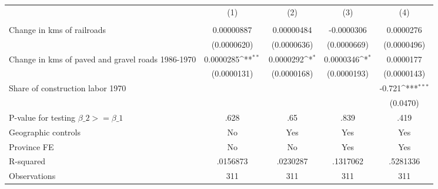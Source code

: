 {
\def\sym#1{\ifmmode^{#1}\else\(^{#1}\)\fi}
\begin{tabular}{l*{4}{c}}
\hline\hline
                &\multicolumn{1}{c}{(1)}&\multicolumn{1}{c}{(2)}&\multicolumn{1}{c}{(3)}&\multicolumn{1}{c}{(4)}\\
                &\multicolumn{1}{c}{}&\multicolumn{1}{c}{}&\multicolumn{1}{c}{}&\multicolumn{1}{c}{}\\
\hline
Change in kms of railroads&0.00000887         &0.00000484         &-0.0000306         &0.0000276         \\
                &(0.0000620)         &(0.0000636)         &(0.0000669)         &(0.0000496)         \\
[1em]
Change in kms of paved and gravel roads 1986-1970&0.0000285\sym{**} &0.0000292\sym{*}  &0.0000346\sym{*}  &0.0000177         \\
                &(0.0000131)         &(0.0000168)         &(0.0000193)         &(0.0000143)         \\
[1em]
Share of construction labor 1970&                  &                  &                  &   -0.721\sym{***}\\
                &                  &                  &                  & (0.0470)         \\
\hline
P-value for testing $\beta\_{2} >= \beta\_{1}$&     .628         &      .65         &     .839         &     .419         \\
Geographic controls&       No         &      Yes         &      Yes         &      Yes         \\
Province FE     &       No         &       No         &      Yes         &      Yes         \\
R-squared       & .0156873         & .0230287         & .1317062         & .5281336         \\
Observations    &      311         &      311         &      311         &      311         \\
\hline\hline
\end{tabular}
}
